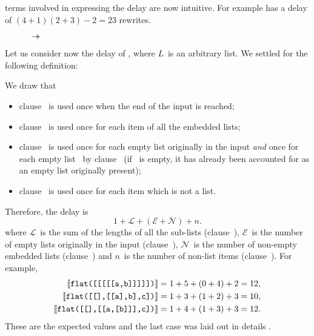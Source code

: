 terms involved in expressing the delay are now intuitive. For example
 has a delay of \((4+1)(2+3)-2 = 23\)
rewrites.
\begin{figure}
\centering
{}
\quad
{}
\qquad
{}
\caption{ \(\twoheadrightarrow\) \erlcode{[\(I_0,
      I_1, \dots, I_{n-1}\)]}
\label{fig:sflat_iota}}
\end{figure}

Let us consider now the delay of , where \(L\)~is
an arbitrary list. We settled for the following definition:

We draw that
\begin{itemize}

  \item clause~\clause{\alpha} is used once when the end of the
    input is reached;

  \item clause~\clause{\gamma} is used once for each item of all the
    embedded lists;

  \item clause~\clause{\beta} is used once for each empty list
    originally in the input \emph{and} once for each empty
    list~ by clause~\clause{\gamma} (if ~is
    empty, it has already been accounted for as an empty list
    originally present);

  \item clause~\clause{\delta} is used once for each item which is not
    a list.

\end{itemize}
Therefore, the delay is
\[
1 + \mathcal{L} + (\mathcal{E} + \mathcal{N}) + n.
\]
where \(\mathcal{L}\)~is the sum of the lengths of all the
sub\hyp{}lists (clause~\clause{\gamma}), \(\mathcal{E}\)~is the number
of empty lists originally in the input (clause~\clause{\beta}),
\(\mathcal{N}\)~is the number of non\hyp{}empty embedded lists
(clause~\clause{\beta}) and \(n\)~is the number of non\hyp{}list items
(clause~\clause{\delta}). For example,
\begin{align*}
\llbracket{\texttt{flat([[[[[a,b]]]]])}}\rrbracket    &= 1 + 5 + (0+4) + 2 = 12,\\
\llbracket{\texttt{flat([[],[[a],b],c])}}\rrbracket   &= 1 + 3 + (1+2) + 3 = 10,\\
\llbracket{\texttt{flat([[],[[a,[b]]],c])}}\rrbracket &= 1 + 4 + (1+3) + 3 = 12.
\end{align*}
These are the expected values and the last case was laid out in
details .

